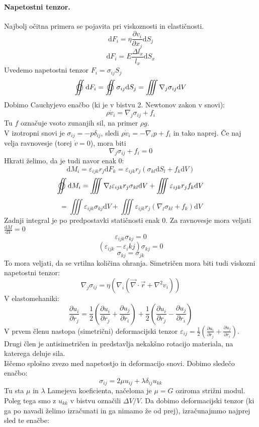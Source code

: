 \documentclass[a4paper]{article}
\newcommand{\vct}[1]{\overrightarrow{#1}}
\newcommand{\dif}{\mathrm{d}}
\newcommand{\pd}[2]{\frac{\partial {#1}}{\partial {#2}}}
\newcommand{\dd}[2]{\frac{\mathrm{d} {#1}}{\mathrm{d} {#2}}}
\begin{document}
\paragraph{Napetostni tenzor.} Najbolj očitna primera se pojavita pri viskoznosti in elastičnosti.
$$\dif F_i = \eta \pd{v_i}{x_j}\dif S_j$$
$$\dif F_i = E \frac{\Delta l_x}{l_x}\dif S_x$$
Uvedemo napetostni tenzor $F_i = \sigma_{ij}S_j$
$$\varoiint \dif F_i = \varoiint \sigma_{ij}\dif S_j = \iiint \nabla_j \sigma_{ij} \dif V$$
Dobimo Cauchyjevo enačbo (ki je v bistvu 2. Newtonov zakon v snovi):
$$\rho \dot{v}_i = \nabla_j\sigma_{ij} + f_i$$
Tu $f$ označuje vsoto zunanjih sil, na primer $\rho g$. \\[3mm]
V izotropni snovi je $\sigma_{ij} = -p \delta_{ij}$, sledi $\rho \dot{v}_i = -\nabla_ip + f_i$ in tako naprej.
Če naj velja ravnovesje (torej $\dot{v} = 0$), mora biti
$$\nabla_j\sigma_{ij} + f_i = 0$$
Hkrati želimo, da je tudi navor enak 0:
$$\dif M_i = \varepsilon_{ijk}r_j\dif F_k = \varepsilon_{ijk}r_j\left(\sigma_{kl}\dif S_l + f_k\dif V\right)$$
$$\varoiint \dif M_i = \iiint \nabla_l \varepsilon_{ijk} r_j \sigma_{kl} \dif V + \iiint \varepsilon_{ijk} r_j f_k \dif V$$
$$= \iiint\varepsilon_{ijk} \sigma_{kj} \dif V + \iiint \varepsilon_{ijk} r_j \left(\nabla_l\sigma_{kl} + f_k\right)\dif V$$
Zadnji integral je po predpostavki statičnosti enak 0.
Za ravnovesje mora veljati $\displaystyle{\dd{M}{V} = 0}$
$$\varepsilon_{ijk}\sigma_{kj} = 0$$
$$\left(\varepsilon_{ijk} - \varepsilon_ikj\right) \sigma_{kj} = 0$$
$$\sigma_{kj} = \sigma_{jk}$$
To mora veljati, da se vrtilna količina ohranja. Simetričen mora biti tudi viskozni napetostni tenzor:
$$\nabla_j\sigma_{ij} = \eta\left(\nabla_i(\vct\nabla\cdot\vct{r} + \nabla^2v_i)\right)$$
V elastomehaniki:
$$\pd{u_i}{r_j} = \frac{1}{2}\left(\pd{u_i}{r_j} + \pd{u_j}{r_i}\right) + \frac{1}{2}\left(\pd{u_i}{r_j} - \pd{u_j}{r_i}\right)$$
V prvem členu nastopa (simetrični) deformacijski tenzor $\displaystyle{\varepsilon_{ij} = \frac{1}{2}\left(\pd{u_i}{r_j} + \pd{u_j}{r_i}\right)}$.
Drugi člen je antisimetričen in predstavlja nekakšno rotacijo materiala, na katerega deluje sila. \\
Iščemo splošno zvezo med napetostjo in deformacijo snovi. Dobimo sledečo enačbo:
$$\sigma_{ij} = 2\mu u_{ij} + \lambda \delta_{ij}u_{kk}$$
Tu sta $\mu$ in $\lambda$ Lamejeva koeficienta, načeloma je $\mu = G$ oziroma strižni modul. Poleg tega smo z $u_{kk}$ v bistvu označili $\Delta V / V$.
Da dobimo deformacijski tenzor (ki ga po navadi želimo izračunati in ga nimamo že od prej), izračunajmmo najprej sled te enačbe:
\end{document}
